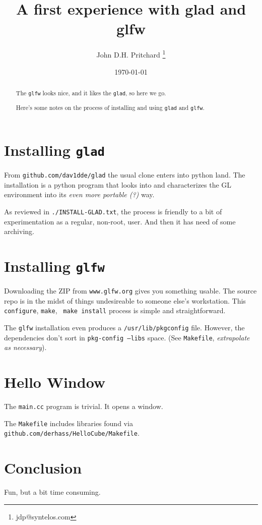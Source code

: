 \documentclass[12pt,twocolumn]{article}
\begin{document}
\title{A first experience with glad and glfw}

\author{John D.H. Pritchard \thanks{jdp@syntelos.com}}

\date{\today}

\maketitle


\begin{abstract}

The {\tt glfw} looks nice, and it likes the {\tt glad}, so here we go.

Here's some notes on the process of installing and using {\tt glad}
and {\tt glfw}.

\end{abstract}


\section{Installing {\tt glad}}

From {\tt github.com/dav1dde/glad} the usual clone enters into python
land.  The installation is a python program that looks into and
characterizes the GL environment into its {\it even more portable (?)
}  way.  

As reviewed in {\tt ./INSTALL-GLAD.txt}, the process is friendly to a
bit of experimentation as a regular, non-root, user.  And then it has
need of some archiving.

\section{Installing {\tt glfw}}

Downloading the ZIP from {\tt www.glfw.org} gives you something
usable.  The source repo is in the midst of things undesireable to
someone else's workstation.  This {\tt configure}, {\tt make}, {\tt
  make install} process is simple and straightforward.  

The {\tt glfw} installation even produces a {\tt /usr/lib/pkgconfig}
file.  However, the dependencies don't sort in {\tt pkg-config --libs}
space.  (See {\tt Makefile}, {\it extrapolate as necessary}).

\section{Hello Window}

The {\tt main.cc} program is trivial.  It opens a window.

The {\tt Makefile} includes libraries found via {\tt
  github.com/derhass/HelloCube/Makefile}.


\section{Conclusion}

Fun, but a bit time consuming.
\end{document}
